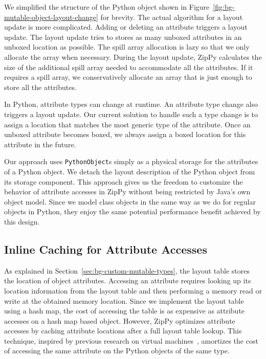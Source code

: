 We simplified the structure of the Python object shown in Figure~\ref{fig:bg-mutable-object-layout-change} for brevity.
The actual algorithm for a layout update is more complicated.
Adding or deleting an attribute triggers a layout update.
The layout update tries to stores as many unboxed attributes in an unboxed location as possible.
The spill array allocation is lazy so that we only allocate the array when necessary.
During the layout update, ZipPy calculates the size of the additional spill array needed to accommodate all the attributes.
If it requires a spill array, we conservatively allocate an array that is just enough to store all the attributes.

In Python, attribute types can change at runtime.
An attribute type change also triggers a layout update.
Our current solution to handle such a type change is to assign a location that matches the most generic type of the attribute.
Once an unboxed attribute becomes boxed, we always assign a boxed location for this attribute in the future.

Our approach uses \texttt{PythonObject}s simply as a physical storage for the attributes of a Python object.
We detach the layout description of the Python object from its storage component.
This approach gives us the freedom to customize the behavior of attribute accesses in ZipPy without being restricted by Java's own object model.
Since we model class objects in the same way as we do for regular objects in Python, they enjoy the same potential performance benefit achieved by this design.

\subsection{Inline Caching for Attribute Accesses}

As explained in Section~\ref{sec:bg-custom-mutable-types}, the layout table stores the location of object attributes.
Accessing an attribute requires looking up its location information from the layout table and then performing a memory read or write at the obtained memory location.
Since we implement the layout table using a hash map, the cost of accessing the table is as expensive as attribute accesses on a hash map based object.
However, ZipPy optimizes attribute accesses by caching attribute locations after a full layout table lookup.
This technique, inspired by previous research on virtual machines~\cite{Deutsch1984, Holzle+1991, Brunthaler2010inca}, amortizes the cost of accessing the same attribute on the Python objects of the same type.


